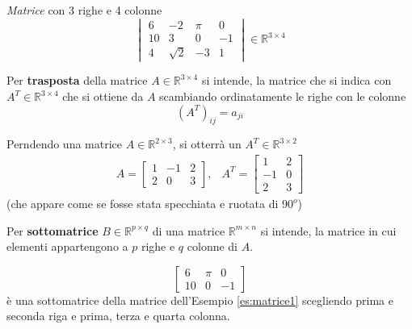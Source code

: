 \begin{es}
  \label{es:matrice1}
  \textit{Matrice} con 3 righe e 4 colonne
  \begin{equation*}
    \begin{vmatrix}
      6 & -2 & \pi & 0\\
      10 & 3 & 0 & -1\\
      4 & \sqrt{2} & -3 & 1
    \end{vmatrix} \in \mathds{R}^{3 \times 4}
  \end{equation*}
\end{es}
\begin{defi}
  \label{defi:matrice2}
  Per \textbf{trasposta} della matrice $A\in \mathds{R}^{3\times 4}$ si
  intende, la matrice che si indica con $A^T\in \mathds{R}^{3\times 4}$ che
  si ottiene da $A$ scambiando ordinatamente le righe con le colonne
  \begin{equation*}
    (A^T)_{ij}=a_{ji}
  \end{equation*}
\end{defi}
\begin{es}
  \label{es:matrice2}
  Perndendo una matrice $A \in \mathds{R}^{2\times3}$, si otterrà un
  $A^T\in \mathds{R}^{3\times2}$
  \begin{eqnarray*}
    A=
    \begin{bmatrix}
      1 & -1 & 2\\
      2 & 0 & 3
    \end{bmatrix}, & A^T=
                     \begin{bmatrix}
                       1 & 2  \\
                       -1 & 0 \\
                       2 & 3
                     \end{bmatrix}
  \end{eqnarray*}
  (che appare come se fosse stata specchiata e ruotata di $90^o$)
\end{es}
\begin{defi}
  \label{defi:matrice3}
  Per \textbf{sottomatrice} $B\in\mathds{R}^{p\times q}$ di una matrice
  $\mathds{R}^{m \times n}$ si intende, la matrice in cui elementi
  appartengono a $p$ righe e $q$ colonne di $A$.
\end{defi}
\begin{es}
  \label{es:matrice3}
  \begin{equation*}
    \begin{bmatrix}
      6 & \pi & 0\\
      10 & 0 & -1
    \end{bmatrix}
  \end{equation*}
  è una sottomatrice della matrice dell'Esempio \ref{es:matrice1}
  scegliendo prima e seconda riga e prima, terza e quarta colonna.
\end{es}
